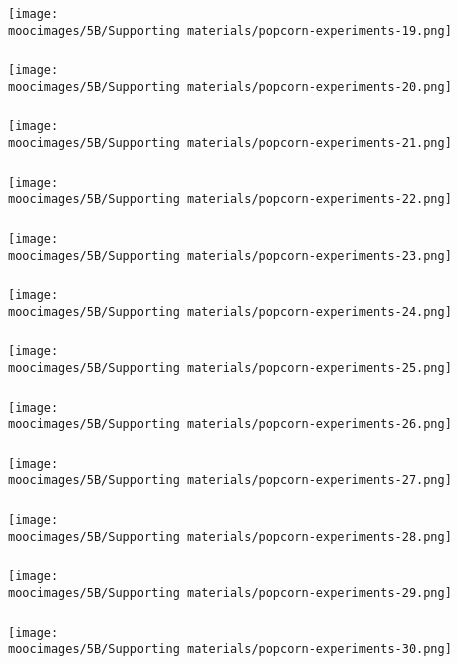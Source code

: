 \documentclass[handout,11pt,aspectratio=169,mathserif]{beamer}
\begin{document}
\begin{frame}\frametitle{}
	\centerline{\texttt{[image: \\moocimages/5B/Supporting materials/popcorn-experiments-19.png]}}
\end{frame}
\begin{frame}\frametitle{}
	\centerline{\texttt{[image: \\moocimages/5B/Supporting materials/popcorn-experiments-20.png]}}
\end{frame}
\begin{frame}\frametitle{}
	\centerline{\texttt{[image: \\moocimages/5B/Supporting materials/popcorn-experiments-21.png]}}
\end{frame}
\begin{frame}\frametitle{}
	\centerline{\texttt{[image: \\moocimages/5B/Supporting materials/popcorn-experiments-22.png]}}
\end{frame}
\begin{frame}\frametitle{}
	\centerline{\texttt{[image: \\moocimages/5B/Supporting materials/popcorn-experiments-23.png]}}
\end{frame}
\begin{frame}\frametitle{}
	\centerline{\texttt{[image: \\moocimages/5B/Supporting materials/popcorn-experiments-24.png]}}
\end{frame}
\begin{frame}\frametitle{}
	\centerline{\texttt{[image: \\moocimages/5B/Supporting materials/popcorn-experiments-25.png]}}
\end{frame}
\begin{frame}\frametitle{}
	\centerline{\texttt{[image: \\moocimages/5B/Supporting materials/popcorn-experiments-26.png]}}
\end{frame}
\begin{frame}\frametitle{}
	\centerline{\texttt{[image: \\moocimages/5B/Supporting materials/popcorn-experiments-27.png]}}
\end{frame}
\begin{frame}\frametitle{}
	\centerline{\texttt{[image: \\moocimages/5B/Supporting materials/popcorn-experiments-28.png]}}
\end{frame}
\begin{frame}\frametitle{}
	\centerline{\texttt{[image: \\moocimages/5B/Supporting materials/popcorn-experiments-29.png]}}
\end{frame}
\begin{frame}\frametitle{}
	\centerline{\texttt{[image: \\moocimages/5B/Supporting materials/popcorn-experiments-30.png]}}
\end{frame}
\end{document}
